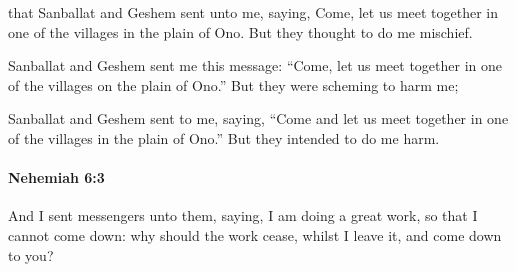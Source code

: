 			\begin{versebox}
					\item[BHS] 
					\item[LXX] 
					\item[ASV] that Sanballat and Geshem sent unto me, saying, Come, let us meet together in one of the villages in the plain of Ono. But they thought to do me mischief.
					\item[NIV] Sanballat and Geshem sent me this message: “Come, let us meet together in one of the villages on the plain of Ono.” But they were scheming to harm me;
					\item[NRSV] Sanballat and Geshem sent to me, saying, “Come and let us meet together in one of the villages in the plain of Ono.” But they intended to do me harm.
			\end{versebox}

		\paragraph{Nehemiah 6:3} %
			\label{NEHEMIAH-6-3}

			And I sent messengers unto them, saying, I am doing a great work, so that I cannot come down: why should the work cease, whilst I leave it, and come down to you?

